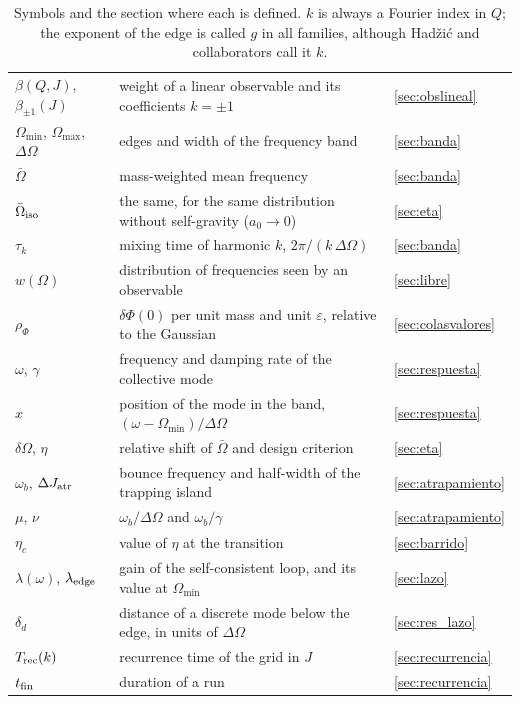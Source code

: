 \documentclass[11pt,a4paper]{article}
\begin{document}
\begin{table}[!htbp]
\begin{tabular}{L{3.3cm}L{9.6cm}l}
$\beta(Q,J)$, $\beta_{\pm1}(J)$ & weight of a linear observable and its coefficients $k=\pm1$ & \ref{sec:obslineal}\\
$\Omega_{\min}$, $\Omega_{\max}$, $\Delta\Omega$ & edges and width of the frequency band & \ref{sec:banda}\\
$\bar\Omega$ & mass-weighted mean frequency & \ref{sec:banda}\\
$\bar\Omega_{\rm iso}$ & the same, for the same distribution without self-gravity ($a_0\to0$) & \ref{sec:eta}\\
$\tau_k$ & mixing time of harmonic $k$, $2\pi/(k\,\Delta\Omega)$ & \ref{sec:banda}\\
$w(\Omega)$ & distribution of frequencies seen by an observable & \ref{sec:libre}\\
$\rho_\Phi$ & $\delta\Phi(0)$ per unit mass and unit $\varepsilon$, relative to the Gaussian & \ref{sec:colasvalores}\\
$\omega$, $\gamma$ & frequency and damping rate of the collective mode & \ref{sec:respuesta}\\
$x$ & position of the mode in the band, $(\omega-\Omega_{\min})/\Delta\Omega$ & \ref{sec:respuesta}\\
$\delta\Omega$, $\eta$ & relative shift of $\bar\Omega$ and design criterion & \ref{sec:eta}\\
$\omega_b$, $\Delta J_{\rm atr}$ & bounce frequency and half-width of the trapping island & \ref{sec:atrapamiento}\\
$\mu$, $\nu$ & $\omega_b/\Delta\Omega$ and $\omega_b/\gamma$ & \ref{sec:atrapamiento}\\
$\eta_c$ & value of $\eta$ at the transition & \ref{sec:barrido}\\
$\lambda(\omega)$, $\lambda_{\rm edge}$ & gain of the self-consistent loop, and its value at $\Omega_{\min}$ & \ref{sec:lazo}\\
$\delta_d$ & distance of a discrete mode below the edge, in units of $\Delta\Omega$ & \ref{sec:res_lazo}\\
$T_{\rm rec}(k)$ & recurrence time of the grid in $J$ & \ref{sec:recurrencia}\\
$t_{\rm fin}$ & duration of a run & \ref{sec:recurrencia}\\
\bottomrule
\end{tabular}
\caption{Symbols and the section where each is defined. $k$ is always a Fourier index in
$Q$; the exponent of the edge is called $g$ in all families, although Hadžić and
collaborators call it $k$.}
\label{tab:simbolos}
\end{table}
\end{document}
